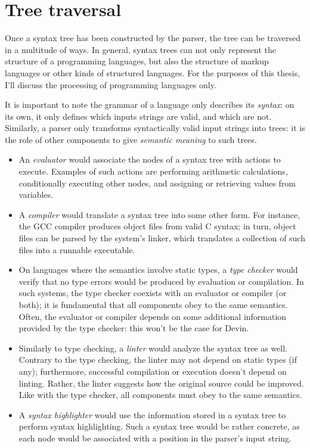 \documentclass[11pt, american, draft]{PhdThesis}
\begin{document}
  \chapter{Tree traversal}

  Once a syntax tree has been constructed by the parser, the tree can be traversed in a multitude of
  ways. In general, syntax trees can not only represent the structure of a programming languages,
  but also the structure of markup languages or other kinds of structured languages. For the
  purposes of this thesis, I'll discuss the processing of programming languages only.

  It is important to note the grammar of a language only describes its \emph{syntax}: on its own,
  it only defines which inputs strings are valid, and which are not. Similarly, a parser only
  transforms syntactically valid input strings into trees: it is the role of other components to
  give \emph{semantic meaning} to such trees.

  \begin{itemize}[noitemsep,topsep=0pt]
    \item An \emph{evaluator} would associate the nodes of a syntax tree with actions to execute.
          Examples of such actions are performing arithmetic calculations, conditionally executing
          other nodes, and assigning or retrieving values from variables.

    \item A \emph{compiler} would translate a syntax tree into some other form. For instance, the
          GCC compiler produces object files from valid C syntax; in turn, object files can be
          parsed by the system's linker, which translates a collection of such files into a runnable
          executable.

    \item On languages where the semantics involve static types, a \emph{type checker} would verify
          that no type errors would be produced by evaluation or compilation. In such systems, the
          type checker coexists with an evaluator or compiler (or both); it is fundamental that all
          components obey to the same semantics. Often, the evaluator or compiler depends on some
          additional information provided by the type checker: this won't be the case for Devin.

    \item Similarly to type checking, a \emph{linter} would analyze the syntax tree as well.
          Contrary to the type checking, the linter may not depend on static types (if any);
          furthermore, successful compilation or execution doesn't depend on linting. Rather, the
          linter suggests how the original source could be improved. Like with the type checker, all
          components must obey to the same semantics.

    \item A \emph{syntax highlighter} would use the information stored in a syntax tree to perform
          syntax highlighting. Such a syntax tree would be rather concrete, as each node would be
          associated with a position in the parser's input string.
  \end{itemize}
\end{document}
